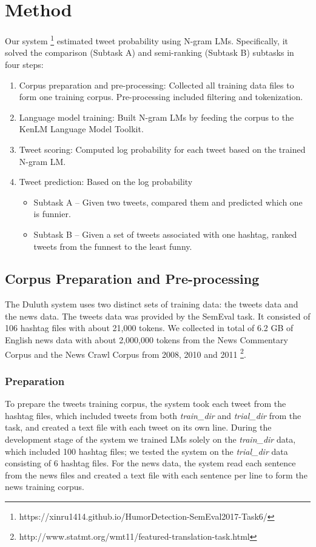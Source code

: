 \documentclass[11pt,a4paper]{article}
\begin{document}
\section{Method}
Our system \footnote{https://xinru1414.github.io/HumorDetection-SemEval2017-Task6/} estimated tweet probability using N-gram LMs. Specifically, it solved the comparison (Subtask A) and semi-ranking (Subtask B) subtasks in four steps:
\begin{enumerate}
\item Corpus preparation and pre-processing: Collected all training data files to form one training corpus. Pre-processing included filtering and tokenization.
\item Language model training: Built N-gram LMs by feeding the corpus to the KenLM Language Model Toolkit. 
\item Tweet scoring: Computed log probability for each tweet based on the trained N-gram LM.
\item Tweet prediction: Based on the log probability
\begin{itemize}
\item Subtask A -- Given two tweets, compared them and predicted which one is funnier. 
\item Subtask B -- Given a set of tweets associated with one hashtag, ranked tweets from the funnest to the least funny.
\end{itemize}
\end{enumerate}

\subsection{Corpus Preparation and Pre-processing}
The Duluth system uses two distinct sets of training data: the tweets data and the news data. The tweets data was provided by the SemEval task. It consisted of 106 hashtag files with about 21,000 tokens. We collected in total of 6.2 GB of English news data with about 2,000,000 tokens from the News Commentary Corpus and the News Crawl Corpus from 2008, 2010 and 2011 \footnote{http://www.statmt.org/wmt11/featured-translation-task.html}.   
\subsubsection{Preparation}
To prepare the tweets training corpus, the system took each tweet from the hashtag files, which included tweets from both \textit{train\_dir} and \textit{trial\_dir} from the task, and created a text file with each tweet on its own line. During the development stage of the system we trained LMs solely on the \textit{train\_dir} data, which included 100 hashtag files; we tested the system on the \textit{trial\_dir} data consisting of 6 hashtag files. For the news data, the system read each sentence from the news files and created a text file with each sentence per line to form the news training corpus. 
\end{document}
